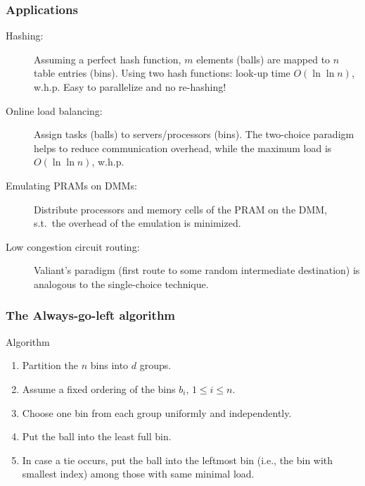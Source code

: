 \documentclass[professionalfonts]{beamer}
\newcommand\scalefac{0.55}
\newcommand\ballsize{5mm}
\newcommand\nrbins{6}
\newcommand\padding{0.1*\ballsize}
\newcommand\binheight{5*\balldiameter}
\newcommand\bingap{1.6*\balldiameter}
\newcommand\balldiameter{2*\ballsize}
\newcommand\iA[2][0]{
	\path (\nbid) edge[insert, bend left=#1] (#2);
}
\newcommand\bin[1]{
	\path node[topflat, xshift=#1*\bingap*\scalefac, above, yshift=-\padding*\scalefac]  {};
}
\newcommand\bins{
	\foreach \ibin in {1,...,\nrbins}
		\bin{\ibin};
}
\newcommand\setNode[2]{
	\draw let \n1 ={#1#2} in node[circle, minimum size = \ballsize](n\n1) at (#1*\bingap,#2*\balldiameter-\ballsize) {};
}
\newcommand\nodes{
	\foreach \i in {1,...,6}
		\foreach \j in {1,...,5}
			\setNode{\i}{\j};
}
\newcommand\ball[2]{
	\shade[ballstyle] (#1*\bingap,#2*\balldiameter-\ballsize) circle (\ballsize) {};
}
\newcommand\nbid{nb}
\newcommand\newball{
	\draw node[circle, minimum size = \ballsize](\nbid) at (0*\bingap,6*\balldiameter-\ballsize) {};
	\ball{0}{6};
}
\newcommand\putinbin[2]{
	\ifnum #2 > 0
		\foreach \nrballs in {1,...,#2}
 			\ball{#1}{\nrballs};
 	\fi
}
\newcounter{index}
\newcommand\balls[1]{%
	\getargsC{#1}%
  	\setcounter{index}{0}%
  	\whiledo{\theindex < \narg}{%
    		\stepcounter{index}%
    		\putinbin{\theindex}{\csname arg\romannumeral\theindex\endcsname}%
  	}%
}
\newcommand\bab[1]{%
	\bins
	\nodes
	\balls{#1}
}
\newcommand\groupSep[1]{
	\draw[thick, color=red!40] let \n1={(#1+0.5)*\bingap} in (\n1,-\ballsize) -- (\n1,\binheight +\ballsize);
}
\begin{document}
\begin{frame}
\frametitle{Applications}
\begin{description}
	\item[Hashing:] Assuming a perfect hash function, $m$ elements (balls) are mapped to $n$ table entries (bins). Using two hash functions: look-up time $O(\ln\ln n)$, w.h.p. \alert{Easy to parallelize} and  \alert{no re-hashing}!
	\item[Online load balancing:] Assign tasks (balls) to servers/processors (bins). The two-choice paradigm helps to \alert{reduce communication overhead}, %
	while the maximum load is $O(\ln\ln n)$, w.h.p.
	\item[Emulating PRAMs on DMMs:] Distribute processors and memory cells of the PRAM on the DMM, s.t.~the overhead of the emulation is minimized.
	\item[Low congestion circuit routing:] \alert{Valiant's paradigm} (first
          route to some random intermediate
          destination) %
          is analogous to the single-choice technique.
\end{description}
\end{frame}


\newcommand\aglAlgorithm{
\begin{exampleblock}{Algorithm}
\begin{enumerate}
\item \alert{Partition} the $n$ bins into $d$ groups.
\item Assume a \alert{fixed ordering} of the bins $b_i$, $1\leq i \leq n$.
\item Choose one bin \alert{from each group} uniformly and independently.
\item Put the ball into the \alert{least full} bin.
\item In case a \alert{tie} occurs, put the ball into the \alert{leftmost} bin (i.e., the bin with smallest index) among those with same minimal load.
\end{enumerate}
\end{exampleblock}
}

\begin{frame}[shrink]
\frametitle{The Always-go-left algorithm}
\aglAlgorithm

\begin{center}
\end{center}

\end{frame}
\end{document}
